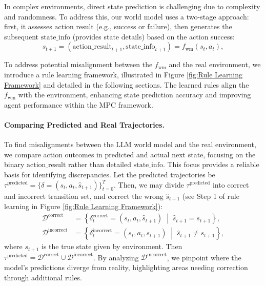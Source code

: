 \documentclass{article} %
\begin{document}
In complex environments, direct state prediction is challenging due to complexity and randomness. To address this, our world model uses a two-stage approach: first, it assesses $\text{action\_result}$ (e.g., success or failure), then generates the subsequent $\text{state\_info}$ (provides state details) based on the action success:
\begin{equation}
\hat{s}_{t+1} = \left( \text{action\_result}_{t+1}, \text{state\_info}_{t+1} \right) = f_{\text{wm}}(s_t, a_t),
\end{equation}

To address potential misalignment between the $f_{\text{wm}}$ and the real environment, we introduce a rule learning framework, illustrated in Figure \ref{fig:Rule Learning Framework} and
detailed in the following sections.
The learned rules align the $f_{\text{wm}}$ with the environment, enhancing state prediction accuracy and improving agent performance within the MPC framework.

\paragraph{Comparing Predicted and Real Trajectories.}
\label{sec:Comparing Predicted and Real Trajectories}
To find misalignments between the LLM world model and the real environment, we compare action outcomes in predicted and actual next state, focusing on the binary $\text{action\_result}$ rather than detailed $\text{state\_info}$. This focus provides a reliable basis for identifying discrepancies.
Let the predicted trajectories be $\tau^{\text{predicted}} = \{ \delta = (s_t, a_t, \hat{s}_{t+1}) \}_{t=0}^{T}$. 
Then, we may divide $\tau^{\text{predicted}}$ into correct and incorrect transition set, and correct the wrong $\hat{s}_{t+1}$ (see Step 1 of rule learning in Figure \ref{fig:Rule Learning Framework}):
\begin{equation}
    \begin{aligned}
        \mathcal{D}^{\text{correct}} &= \left\{ \delta^{\text{correct}}_t = (s_t, a_t, \hat{s}_{t+1}) \; \middle|\; \hat{s}_{t+1} = s_{t+1} \right\}, \\
        \mathcal{D}^{\text{incorrect}} &= \left\{ \delta^{\text{incorrect}}_t = (s_t, a_t, s_{t+1}) \; \middle|\; \hat{s}_{t+1} \neq s_{t+1} \right\},
    \end{aligned}
\end{equation}
where $s_{t+1}$ is the true state given by environment.
Then $\tau^{\text{predicted}} = \mathcal{D}^{\text{correct}} \cup \mathcal{D}^{\text{incorrect}}$.
By analyzing $\mathcal{D}^{\text{incorrect}}$, we pinpoint where the model's predictions diverge from reality, highlighting areas needing correction through additional rules.
\end{document}
